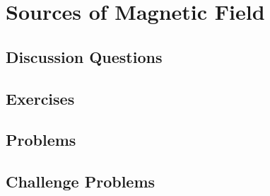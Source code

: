 
\chapter{Sources of Magnetic Field}

\section{Discussion Questions}

\section{Exercises}

\section{Problems}

\section{Challenge Problems}
